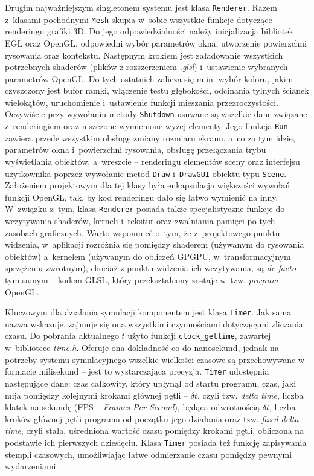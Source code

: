 	Drugim najważniejszym singletonem systemu jest klasa \texttt{Renderer}. Razem z~klasami pochodnymi \texttt{Mesh} skupia w~sobie wszystkie funkcje dotyczące renderingu grafiki 3D. Do jego odpowiedzialności należy inicjalizacja bibliotek EGL oraz OpenGL, odpowiedni wybór parametrów okna, utworzenie powierzchni rysowania oraz kontekstu. Następnym krokiem jest załadowanie wszystkich potrzebnych shaderów (plików z rozszerzeniem \emph{.glsl}) i~ustawienie wybranych parametrów OpenGL. Do tych ostatnich zalicza się m.in. wybór koloru, jakim czyszczony jest bufor ramki, włączenie testu głębokości, odcinania tylnych ścianek wielokątów, uruchomienie i~ustawienie funkcji mieszania przezroczystości. Oczywiście przy wywołaniu metody \texttt{Shutdown} usuwane są wszelkie dane związane z~renderingiem oraz niszczone wymienione wyżej elementy. Jego funkcja \texttt{Run} zawiera przede wszystkim obsługę zmiany rozmiaru ekranu, a~co za tym idzie, parametrów okna i~powierzchni rysowania, obsługę przełączania trybu wyświetlania obiektów, a~wreszcie -- renderingu elementów sceny oraz interfejsu użytkownika poprzez wywołanie metod \texttt{Draw} i~\texttt{DrawGUI} obiektu typu \texttt{Scene}. Założeniem projektowym dla tej klasy była enkapsulacja większości wywołań funkcji OpenGL, tak, by kod renderingu dało się łatwo wymienić na inny. W~związku z~tym, klasa \texttt{Renderer} posiada także specjalistyczne funkcje do wczytywania shaderów, kerneli i~tekstur oraz zwalniania pamięci po tych zasobach graficznych. Warto wspomnieć o~tym, że z~projektowego punktu widzenia, w~aplikacji rozróżnia się pomiędzy shaderem (używanym do rysowania obiektów) a~kernelem (używanym do obliczeń GPGPU, w~transformacyjnym sprzężeniu zwrotnym), chociaż z punktu widzenia ich wczytywania, są \emph{de facto} tym samym -- kodem GLSL, który przekształcony zostaje w~tzw. \emph{program} OpenGL. 
	
	Kluczowym dla działania symulacji komponentem jest klasa \texttt{Timer}. Jak sama nazwa wskazuje, zajmuje się ona wszystkimi czynnościami dotyczącymi zliczania czasu. Do pobrania aktualnego \(t\) użyto funkcji \texttt{clock\_gettime}, zawartej w~bibliotece \emph{time.h}. Oferuje ona dokładność co do nanosekund, jednak na potrzeby systemu symulacyjnego wszelkie wielkości czasowe są przechowywane w formacie milisekund -- jest to wystarczająca precyzja. \texttt{Timer} udostępnia następujące dane: czas całkowity, który upłynął od startu programu, czas, jaki mija pomiędzy kolejnymi krokami głównej pętli -- \(\delta t \), czyli tzw. \emph{delta time}, liczba klatek na sekundę (FPS -- \emph{Frames Per Second}), będąca odwrotnością \(\delta t \), liczba kroków głównej pętli programu od początku jego działania oraz tzw. \emph{fixed delta time}, czyli stała, uśredniona wartość czasu pomiędzy krokami pętli, obliczona na podstawie ich pierwszych dziesięciu. Klasa \texttt{Timer} posiada też funkcję zapisywania stempli czasowych, umożliwiając łatwe odmierzanie czasu pomiędzy pewnymi wydarzeniami.
	
